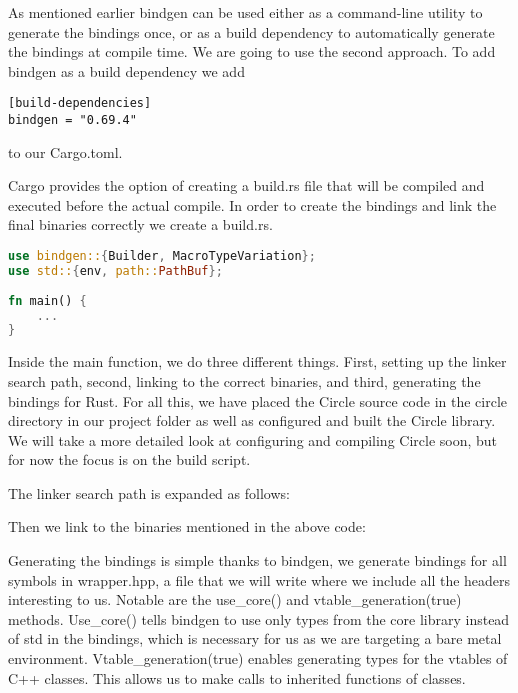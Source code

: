 As mentioned earlier bindgen can be used either as a command-line utility to generate the bindings once,
or as a build dependency to automatically generate the bindings at compile time.
We are going to use the second approach.
To add bindgen as a build dependency we add
\begin{verbatim}
[build-dependencies]
bindgen = "0.69.4"
\end{verbatim}
to our Cargo.toml.

Cargo provides the option of creating a build.rs file that will be compiled and executed before the actual compile.
In order to create the bindings and link the final binaries correctly we create a build.rs.
\begin{lstlisting}[language=Rust,style=colouredRust]
use bindgen::{Builder, MacroTypeVariation};
use std::{env, path::PathBuf};
    
fn main() {
    ...
}    
\end{lstlisting}

Inside the main function, we do three different things.
First, setting up the linker search path, second, linking to the correct binaries, and third, generating the bindings for Rust.
For all this, we have placed the Circle source code in the circle directory in our project folder as well as configured and built the Circle library.
We will take a more detailed look at configuring and compiling Circle soon, but for now the focus is on the build script.

The linker search path is expanded as follows:


Then we link to the binaries mentioned in the above code:


Generating the bindings is simple thanks to bindgen, we generate bindings for all symbols in wrapper.hpp,
a file that we will write where we include all the headers interesting to us.
Notable are the use\_core() and vtable\_generation(true) methods.
Use\_core() tells bindgen to use only types from the core library instead of std in the bindings, which is necessary for us as we are targeting a bare metal environment.
Vtable\_generation(true) enables generating types for the vtables of C++ classes.
This allows us to make calls to inherited functions of classes.


